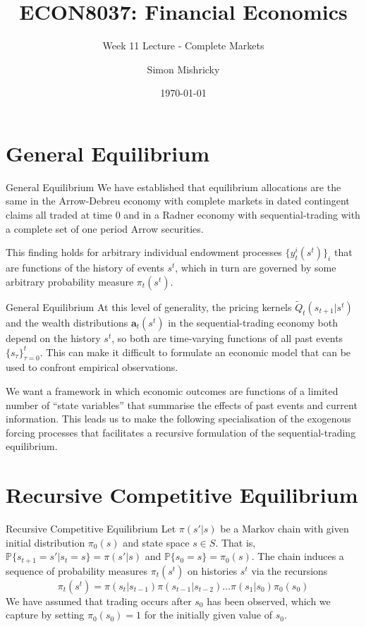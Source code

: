 \documentclass[aspectratio=169,xcolor=dvipsnames]{beamer}
\title{ECON8037: Financial Economics}
\subtitle{\normalsize Week 11 Lecture - Complete Markets}
\author{Simon Mishricky}
\institute{Research School of Economics, Australian National University}
\date{\today}
\begin{document}
\section{General Equilibrium}
\frame{\titlepage}

\begin{frame}{General Equilibrium}
    We have established that equilibrium allocations are the same in the Arrow-Debreu economy with complete markets in dated contingent claims all traded at time 0 and in a Radner economy with sequential-trading with a complete set of one period Arrow securities.

    This finding holds for arbitrary individual endowment processes $\{y^i_t(s^t)\}_i$ that are functions of the history of events $s^t$, which in turn are governed by some arbitrary probability measure $\pi_t(s^t)$.
\end{frame}

\begin{frame}{General Equilibrium}
    At this level of generality, the pricing kernels $\tilde Q_t(s_{t+1} | s^t)$ and the wealth distributions $\mathbf{a}_t(s^t)$ in the sequential-trading economy both depend on the history $s^t$, so both are time-varying functions of all past events $\{s_\tau\}_{\tau=0}^t$. This can make it difficult to formulate an economic model that can be used to confront empirical observations.

    We want a framework in which economic outcomes are functions of a limited number of ``state variables'' that summarise the effects of past events and current information. This leads us to make the following specialisation of the exogenous forcing processes that facilitates a recursive formulation of the sequential-trading equilibrium.
\end{frame}

\section{Recursive Competitive Equilibrium}

\begin{frame}{Recursive Competitive Equilibrium}
    Let $\pi(s' | s)$ be a Markov chain with given initial distribution $\pi_0(s)$ and state space $s \in S$. That is, $\mathbb{P}\{s_{t+1} = s' | s_t = s\} = \pi(s' | s)$ and $\mathbb{P}\{s_0 = s\} = \pi_0(s)$. The chain induces a sequence of probability measures $\pi_t(s^t)$ on histories $s^t$ via the recursions
    \[
        \pi_t(s^t) = \pi(s_t | s_{t-1}) \pi(s_{t-1} | s_{t-2}) \dots \pi(s_1 | s_0) \pi_0(s_0)
    \]
    We have assumed that trading occurs after $s_0$ has been observed, which we capture by setting $\pi_0(s_0) = 1$ for the initially given value of $s_0$.
\end{frame}
\end{document}
